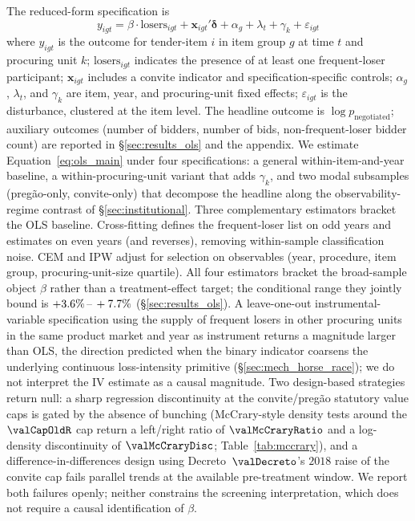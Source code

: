 The reduced-form specification is
\begin{equation}
  y_{igt} = \beta \cdot \text{losers}_{igt}
  + \mathbf{x}_{igt}' \boldsymbol{\delta}
  + \alpha_g + \lambda_t + \gamma_k + \varepsilon_{igt}
  \label{eq:ols_main}
\end{equation}
where $y_{igt}$ is the outcome for tender-item $i$ in item group
$g$ at time $t$ and procuring unit $k$; $\text{losers}_{igt}$
indicates the presence of at least one frequent-loser
participant; $\mathbf{x}_{igt}$ includes a convite indicator and
specification-specific controls; $\alpha_g$, $\lambda_t$, and
$\gamma_k$ are item, year, and procuring-unit fixed effects;
$\varepsilon_{igt}$ is the disturbance, clustered at the item
level. The headline outcome is $\log p_{\text{negotiated}}$;
auxiliary outcomes (number of bidders, number of bids,
non-frequent-loser bidder count) are reported in
\S\ref{sec:results_ols} and the appendix. We estimate
Equation~\eqref{eq:ols_main} under four specifications: a general
within-item-and-year baseline, a within-procuring-unit variant
that adds $\gamma_k$, and two modal subsamples (pregão-only,
convite-only) that decompose the headline along the
observability-regime contrast of \S\ref{sec:institutional}.
Three complementary estimators bracket the OLS baseline.
Cross-fitting defines the frequent-loser list on odd years and
estimates on even years (and reverses), removing within-sample
classification noise. CEM and IPW adjust for selection on
observables (year, procedure, item group, procuring-unit-size
quartile). All four estimators bracket the broad-sample object
$\beta$ rather than a treatment-effect target; the conditional
range they jointly bound is $+3.6\%\,\text{--}\,+7.7\%$
(\S\ref{sec:results_ols}). A leave-one-out instrumental-variable
specification using the supply of frequent losers in other
procuring units in the same product market and year as
instrument returns a magnitude larger than OLS, the direction
predicted when the binary indicator coarsens the underlying
continuous loss-intensity primitive
(\S\ref{sec:mech_horse_race}); we do not interpret the IV
estimate as a causal magnitude. Two design-based strategies
return null: a sharp regression discontinuity at the
convite/preg\~ao statutory value caps is gated by the absence of
bunching (McCrary-style density tests around the $\valCapOldR$
cap return a left/right ratio of $\valMcCraryRatio$ and a
log-density discontinuity of $\valMcCraryDisc$;
Table~\ref{tab:mccrary}), and a difference-in-differences design
using Decreto~$\valDecreto$'s $2018$ raise of the convite cap
fails parallel trends at the available pre-treatment window. We
report both failures openly; neither constrains the screening
interpretation, which does not require a causal identification
of $\beta$.

